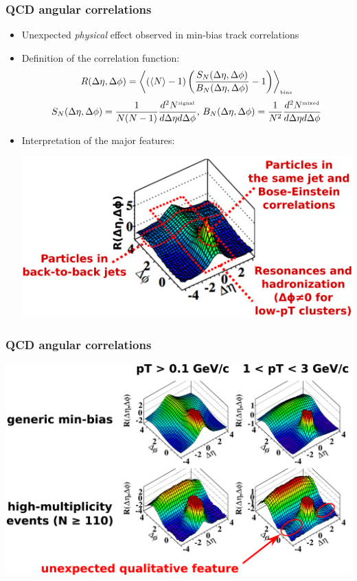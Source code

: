 \documentclass[compress]{beamer}
\begin{document}
\begin{frame}
\frametitle{QCD angular correlations}
\begin{itemize}
\item Unexpected {\it physical} effect observed in min-bias track correlations

\item Definition of the correlation function:
{\tiny
\[ R(\Delta\eta, \Delta\phi) = \left\langle (\langle N \rangle - 1) \left(\frac{S_N(\Delta\eta, \Delta\phi)}{B_N(\Delta\eta, \Delta\phi)} - 1\right) \right\rangle_{\mbox{\tiny bins}} \]
\[ S_N(\Delta\eta, \Delta\phi) = \frac{1}{N(N-1)} \frac{d^2 N^{\mbox{\tiny signal}}}{d\Delta\eta d\Delta\phi} \mbox{, } B_N(\Delta\eta, \Delta\phi) = \frac{1}{N^2} \frac{d^2 N^{\mbox{\tiny mixed}}}{d\Delta\eta d\Delta\phi} \]}

\item Interpretation of the major features:
\begin{center}
\includegraphics[width=0.8\linewidth]{angularcorrelations.pdf}
\end{center}
\end{itemize}
\end{frame}

\begin{frame}
\frametitle{QCD angular correlations}
\includegraphics[width=\linewidth]{angularcorrelations_four.pdf}
\end{frame}
\end{document}
